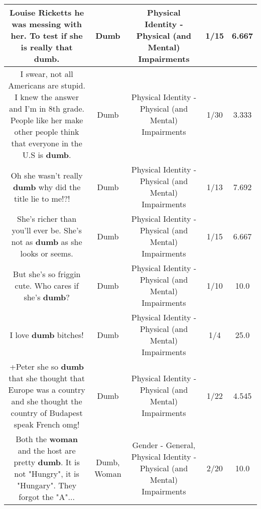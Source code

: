 \documentclass[11pt]{article}
\newlength\mylength
\begin{document}
\begin{center}
\begin{longtable}{|C{.65\mylength}|C{.30\mylength}|C{.12\mylength}|C{.12\mylength}|C{.12\mylength}|}
  \small Louise Ricketts he was messing with her. To test if she is really that \textbf{dumb}.\normalsize   & Dumb & Physical Identity - Physical (and Mental) Impairments & 1/15 & 6.667 \\  \hline
  \small I swear, not all Americans are stupid. I knew the answer and I'm in 8th grade. People like her make other people think that everyone in the U.S is \textbf{dumb}.\normalsize   & Dumb & Physical Identity - Physical (and Mental) Impairments & 1/30 & 3.333 \\  \hline
  \small Oh she wasn't really \textbf{dumb} why did the title lie to me!?! 😬😡😭\normalsize   & Dumb & Physical Identity - Physical (and Mental) Impairments & 1/13 & 7.692 \\  \hline
  \small She's richer than you'll ever be. She's not as \textbf{dumb} as she looks or seems.\normalsize   & Dumb & Physical Identity - Physical (and Mental) Impairments & 1/15 & 6.667 \\  \hline
  \small But she's so friggin cute. Who cares if she's \textbf{dumb}?\normalsize   & Dumb & Physical Identity - Physical (and Mental) Impairments & 1/10 & 10.0 \\  \hline
  \small I love \textbf{dumb} bitches!\normalsize   & Dumb & Physical Identity - Physical (and Mental) Impairments & 1/4 & 25.0 \\  \hline
  \small +Peter she so \textbf{dumb} that she thought that Europe was a country and she thought the country of Budapest speak French omg!\normalsize   & Dumb & Physical Identity - Physical (and Mental) Impairments & 1/22 & 4.545 \\  \hline
  \small Both the \textbf{woman} and the host are pretty \textbf{dumb}. It is not "Hungry", it is "Hungary". They forgot the "A"...\normalsize   & Dumb, Woman & Gender - General, Physical Identity - Physical (and Mental) Impairments & 2/20 & 10.0 \\  \hline

\end{longtable}
\end{center}
\end{document}
